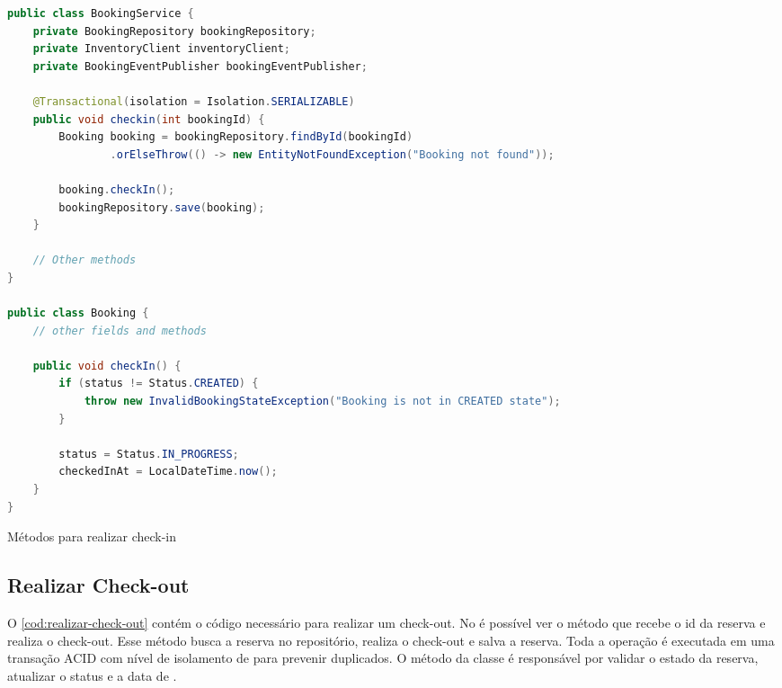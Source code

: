 \begin{codigo}[H]
    \begin{lstlisting}[language=Java]
public class BookingService {
    private BookingRepository bookingRepository;
    private InventoryClient inventoryClient;
    private BookingEventPublisher bookingEventPublisher;

    @Transactional(isolation = Isolation.SERIALIZABLE)
    public void checkin(int bookingId) {
        Booking booking = bookingRepository.findById(bookingId)
                .orElseThrow(() -> new EntityNotFoundException("Booking not found"));

        booking.checkIn();
        bookingRepository.save(booking);
    }

    // Other methods
}

public class Booking {
    // other fields and methods

    public void checkIn() {
        if (status != Status.CREATED) {
            throw new InvalidBookingStateException("Booking is not in CREATED state");
        }

        status = Status.IN_PROGRESS;
        checkedInAt = LocalDateTime.now();
    }
}
    \end{lstlisting}
    \caption{Métodos para realizar check-in}
    \label{cod:realizar-check-in}
\end{codigo}

\subsection{Realizar Check-out}
O \autoref{cod:realizar-check-out} contém o código necessário para realizar um check-out. No  é possível ver o método  que recebe o id da reserva e realiza o check-out. Esse método busca a reserva no repositório, realiza o check-out e salva a reserva. Toda a operação é executada em uma transação ACID com nível de isolamento de  para prevenir  duplicados. O método  da classe  é responsável por validar o estado da reserva, atualizar o status e a data de .

